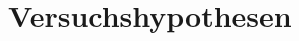 \documentclass[a4paper,11pt]{article}%
\renewcommand{\\}{\vspace*{0.5\baselineskip} \newline}
\begin{document}
%		
%		
%		
		
		


\newpage
\section{Versuchshypothesen}
\end{document}

